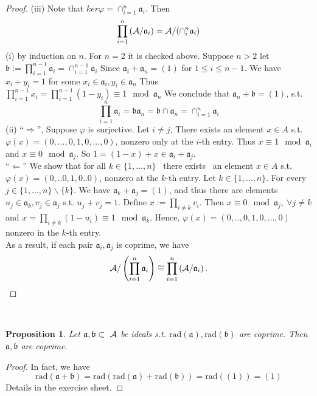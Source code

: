 \documentclass[11pt]{article}
\newtheorem{prop}[thm]{Proposition}
\newcommand{\sca}{{\mathfrak a}}
\newcommand{\scb}{{\mathfrak b}}
\newcommand{\cala}{{\cal A}}
\begin{document}
\begin{proof}
(iii) Note that $ker \varphi =\cap^n_{i=1}\sca_i$. Then $$
\prod_{i=1}^n\left(\cala/\sca_i\right)=\cala/(\cap^n_i\sca_i)
$$
(i) by induction on $n$.
For $n=2$ it is checked above. Suppose $n>2$ let $\scb:=\prod_{i=1}^{n-1}\sca_i=\cap^{n-1}_{i=1}\sca_i$
Since $\sca_i+\sca_n=(1)$ for $1\leq i\leq n-1$. We have $x_i+y_i=1$ for some $x_i\in \sca_i, y_i\in \sca_n$
Thus $\prod_{i=1}^{n-1}x_i= \prod_{i=1}^{n-1}(1-y_i) \equiv 1 \mod \sca_n$
We conclude that $\sca_n+\scb=(1)$, s.t. 
$$
\prod^n_{i=1}\sca_i=\scb \sca_n=\scb\cap \sca_n=\cap_{i=1}^n\sca_i
$$
(ii) ``$\Longrightarrow$'', Suppose $\varphi $ is surjective. Let $i\neq j$, There exists an element $x\in A$ s.t. $\varphi(x)=(0,...,0,1,0,...,0)$, nonzero only at the $i$-th entry.
Thus $x\equiv  1 \mod \sca_i$ and $x\equiv 0\mod \sca_j$.
So $1=(1-x)+x\in \sca_i+\sca_j$.\\
``$\Longleftarrow$'' We show that for all $k\in \{1,...,n\}$
 there exists  an element $x\in A$ s.t. $\varphi(x)=(0,..0,1,0..0)$, nonzero at the $k$-th entry.
Let $k\in \{1,...,n\}$. For every $j\in \{1,...,n\}\backslash\{k\}$.
We have $\sca_k+\sca_j=(1)$, and thus there are elements $u_j\in\sca_k,v_j\in \sca_j$
s.t. $u_j+v_j=1$.
Define $x:=\prod_{i\neq k}v_i$. Then $x\equiv 0 \mod \sca_j,\ \forall j\neq k$ and $x=\prod_{i\neq k}(1-u_i)\equiv 1\mod \sca_k$.
Hence, $\varphi(x)=(0,..,0,1,0,...,0)$ nonzero in the $k$-th entry.\\
As a result, if each pair $\sca_i,\sca_j$ is coprime, we have 
$$
\cala/\left(\prod_{i=1}^n\sca_i\right)\cong \prod_{i=1}^n\left(\cala/\sca_i\right).
$$
\end{proof}

 
\begin{prop}\label{prop:charaterization_coprime_ideals}
Let $\sca,\scb\subset  \cala$ be ideals s.t. $\text{rad}(\sca),\text{rad}(\scb)$ are coprime. Then $\sca, \scb$ are coprime.
\end{prop}
\begin{proof}
In fact, we have
$$
 \text{rad}(\sca+\scb)=\text{rad}(\text{rad}(\sca)+\text{rad}(\scb))=\text{rad}((1))=(1)
$$
Details in the exercise sheet.
\end{proof}
\end{document}
